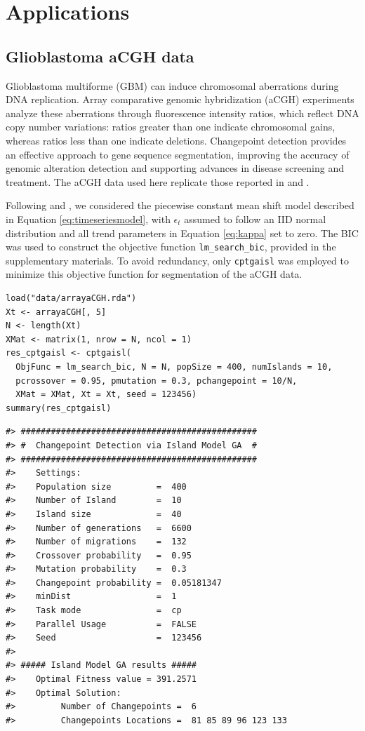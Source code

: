 \section{Applications}\label{applications}

\subsection{Glioblastoma aCGH data}\label{glioblastoma-acgh-data}

Glioblastoma multiforme (GBM) can induce chromosomal aberrations during DNA replication. Array comparative genomic hybridization (aCGH) experiments analyze these aberrations through fluorescence intensity ratios, which reflect DNA copy number variations: ratios greater than one indicate chromosomal gains, whereas ratios less than one indicate deletions. Changepoint detection provides an effective approach to gene sequence segmentation, improving the accuracy of genomic alteration detection and supporting advances in disease screening and treatment. The aCGH data used here replicate those reported in \citet{killick2014changepoint} and \citet{lai2005comparative}.

Following \citet{killick2014changepoint} and \citet{lai2005comparative}, we considered the piecewise constant mean shift model described in Equation \eqref{eq:timeseriesmodel}, with \(\epsilon_{t}\) assumed to follow an IID normal distribution and all trend parameters in Equation \eqref{eq:kappa} set to zero. The BIC was used to construct the objective function \texttt{lm\_search\_bic}, provided in the supplementary materials. To avoid redundancy, only \texttt{cptgaisl} was employed to minimize this objective function for segmentation of the aCGH data.

\begin{verbatim}
load("data/arrayaCGH.rda")
Xt <- arrayaCGH[, 5]
N <- length(Xt)
XMat <- matrix(1, nrow = N, ncol = 1)
res_cptgaisl <- cptgaisl(
  ObjFunc = lm_search_bic, N = N, popSize = 400, numIslands = 10, 
  pcrossover = 0.95, pmutation = 0.3, pchangepoint = 10/N, 
  XMat = XMat, Xt = Xt, seed = 123456)
summary(res_cptgaisl)
\end{verbatim}

\begin{verbatim}
#> ###############################################
#> #  Changepoint Detection via Island Model GA  #
#> ###############################################
#>    Settings: 
#>    Population size         =  400 
#>    Number of Island        =  10 
#>    Island size             =  40 
#>    Number of generations   =  6600 
#>    Number of migrations    =  132 
#>    Crossover probability   =  0.95 
#>    Mutation probability    =  0.3 
#>    Changepoint probability =  0.05181347 
#>    minDist                 =  1 
#>    Task mode               =  cp 
#>    Parallel Usage          =  FALSE 
#>    Seed                    =  123456 
#> 
#> ##### Island Model GA results ##### 
#>    Optimal Fitness value = 391.2571 
#>    Optimal Solution: 
#>         Number of Changepoints =  6 
#>         Changepoints Locations =  81 85 89 96 123 133
\end{verbatim}

